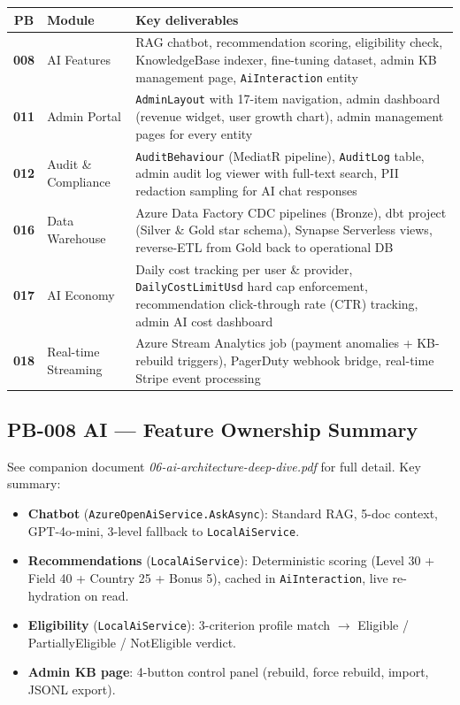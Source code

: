 \documentclass[11pt,a4paper]{article}
\begin{document}
\begin{center}
\begin{tabular}{clp{9.0cm}}
\toprule
\textbf{PB} & \textbf{Module} & \textbf{Key deliverables}\\
\midrule
\textbf{008} & AI Features &
  RAG chatbot, recommendation scoring, eligibility check,
  KnowledgeBase indexer, fine-tuning dataset,
  admin KB management page, \texttt{AiInteraction} entity\\[3pt]
\textbf{011} & Admin Portal &
  \texttt{AdminLayout} with 17-item navigation, admin dashboard (revenue widget,
  user growth chart), admin management pages for every entity\\[3pt]
\textbf{012} & Audit \& Compliance &
  \texttt{AuditBehaviour} (MediatR pipeline), \texttt{AuditLog} table,
  admin audit log viewer with full-text search,
  PII redaction sampling for AI chat responses\\[3pt]
\textbf{016} & Data Warehouse &
  Azure Data Factory CDC pipelines (Bronze),
  dbt project (Silver \& Gold star schema),
  Synapse Serverless views,
  reverse-ETL from Gold back to operational DB\\[3pt]
\textbf{017} & AI Economy &
  Daily cost tracking per user \& provider,
  \texttt{DailyCostLimitUsd} hard cap enforcement,
  recommendation click-through rate (CTR) tracking,
  admin AI cost dashboard\\[3pt]
\textbf{018} & Real-time Streaming &
  Azure Stream Analytics job (payment anomalies + KB-rebuild triggers),
  PagerDuty webhook bridge,
  real-time Stripe event processing\\
\bottomrule
\end{tabular}
\end{center}

\subsection{PB-008 AI --- Feature Ownership Summary}

See companion document \textit{06-ai-architecture-deep-dive.pdf} for full detail.
Key summary:

\begin{itemize}
  \item \textbf{Chatbot} (\texttt{AzureOpenAiService.AskAsync}): Standard RAG,
    5-doc context, GPT-4o-mini, 3-level fallback to \texttt{LocalAiService}.
  \item \textbf{Recommendations} (\texttt{LocalAiService}): Deterministic scoring
    (Level 30 + Field 40 + Country 25 + Bonus 5), cached in \texttt{AiInteraction},
    live re-hydration on read.
  \item \textbf{Eligibility} (\texttt{LocalAiService}): 3-criterion profile match
    $\rightarrow$ Eligible / PartiallyEligible / NotEligible verdict.
  \item \textbf{Admin KB page}: 4-button control panel (rebuild, force rebuild, import, JSONL export).
\end{itemize}
\end{document}
